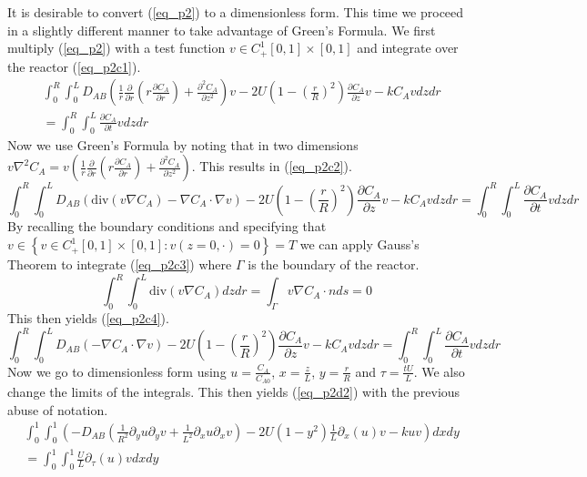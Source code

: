 \documentclass[11pt,fleqn]{article}
\theoremstyle{defstyle}
\begin{document}
It is desirable to convert (\ref{eq_p2}) to a dimensionless form. This time we proceed in a slightly different manner to take advantage of Green's Formula. We first multiply (\ref{eq_p2}) with a test function $v \in C^1_+[0,1]\times[0,1]$ and integrate over the reactor (\ref{eq_p2c1}). 
\begin{equation}
\begin{aligned}
&\int_0^R \int_0^L D_{AB}\left(\frac{1}{r}\frac{\partial}{\partial r}\left(r\frac{\partial C_A}{\partial r}\right) + \frac{\partial^2 C_A}{\partial z^2}\right)v - 2U\left(1-\left(\frac{r}{R}\right)^2\right)\frac{\partial C_A}{\partial z}v - kC_Av dzdr \\ &= \int_0^R \int_0^L \frac{\partial C_A}{\partial t}v dzdr
\end{aligned}
\label{eq_p2c1}
\end{equation}
Now we use Green's Formula by noting that in two dimensions $v\nabla^2C_A = v(\frac{1}{r}\frac{\partial}{\partial r}(r\frac{\partial C_A}{\partial r}) + \frac{\partial^2 C_A}{\partial z^2})$. This results in (\ref{eq_p2c2}).
\begin{equation}
\int_0^R \int_0^L D_{AB}(\text{div}(v\nabla C_A)-\nabla C_A \cdot \nabla v ) - 2U\left(1-\left(\frac{r}{R}\right)^2\right)\frac{\partial C_A}{\partial z}v - kC_Av dzdr = \int_0^R \int_0^L \frac{\partial C_A}{\partial t}v dzdr
\label{eq_p2c2}
\end{equation}
By recalling the boundary conditions and specifying that $v \in \left\{v \in C^1_+[0,1]\times[0,1] : v(z=0,\cdot)=0 \right\} = T$ we can apply Gauss's Theorem to integrate (\ref{eq_p2c3}) where $\Gamma$ is the boundary of the reactor.
\begin{equation}
\int_0^R \int_0^L \text{div}(v\nabla C_A)dzdr = \int_\Gamma v\nabla C_A \cdot n ds = 0 
\label{eq_p2c3}
\end{equation}
This then yields (\ref{eq_p2c4}).
\begin{equation}
\int_0^R \int_0^L D_{AB}(-\nabla C_A \cdot \nabla v ) - 2U\left(1-\left(\frac{r}{R}\right)^2\right)\frac{\partial C_A}{\partial z}v - kC_Av dzdr = \int_0^R \int_0^L \frac{\partial C_A}{\partial t}v dzdr
\label{eq_p2c4}
\end{equation}
Now we go to dimensionless form using $u=\frac{C_A}{C_{A0}}$, $x = \frac{z}{L}$, $y = \frac{r}{R}$ and $\tau = \frac{tU}{L}$. We also change the limits of the integrals. This then yields (\ref{eq_p2d2}) with the previous abuse of notation. 
\begin{equation}
\begin{aligned}
&\int_0^1 \int_0^1 \left(-D_{AB}\left(\frac{1}{R^2}\partial_y u \partial_y v + \frac{1}{L^2}\partial_x u \partial_xv\right) - 2U\left(1-y^2\right)\frac{1}{L}\partial_x(u) v - kuv\right)dxdy \\ &= \int_0^1 \int_0^1 
\frac{U}{L} \partial_\tau(u) v dxdy
\end{aligned}
\label{eq_p2d2}
\end{equation}
\end{document}
